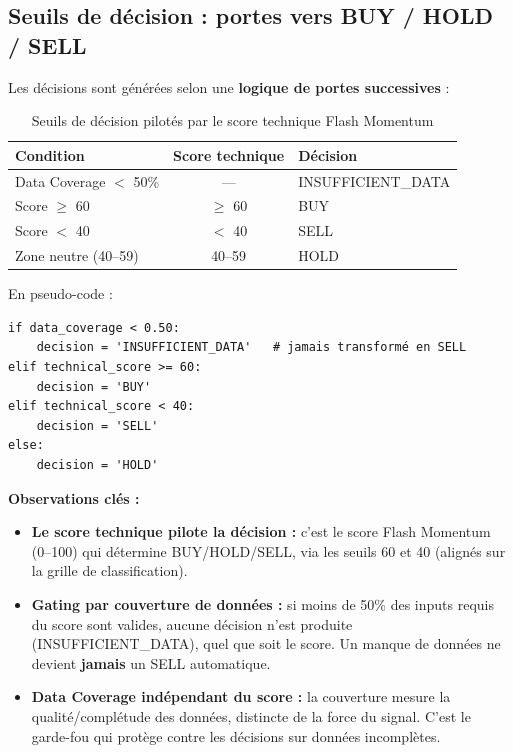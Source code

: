 \documentclass{rapportENSIAS} %
\begin{document}
\subsection{Seuils de décision : portes vers BUY / HOLD / SELL}

\noindent
Les décisions sont générées selon une \textbf{logique de portes successives} :

\begin{table}[H]
\centering
\small
\begin{tabular}{p{5cm}cl}
\toprule
\textbf{Condition} & \textbf{Score technique} & \textbf{Décision} \\
\midrule
Data Coverage $<$ 50\%   & --- & INSUFFICIENT\_DATA \\
Score $\ge$ 60           & $\ge$ 60 & BUY \\
Score $<$ 40             & $<$ 40 & SELL \\
Zone neutre (40--59)     & 40--59 & HOLD \\
\bottomrule
\end{tabular}
\caption{Seuils de décision pilotés par le score technique Flash Momentum}
\label{tab:decision-thresholds}
\end{table}

\noindent
En pseudo-code :

\begin{verbatim}
if data_coverage < 0.50:
    decision = 'INSUFFICIENT_DATA'   # jamais transformé en SELL
elif technical_score >= 60:
    decision = 'BUY'
elif technical_score < 40:
    decision = 'SELL'
else:
    decision = 'HOLD'
\end{verbatim}

\noindent
\textbf{Observations clés :}
\begin{itemize}
    \item \textbf{Le score technique pilote la décision :} c'est le score Flash Momentum (0--100) qui détermine BUY/HOLD/SELL, via les seuils 60 et 40 (alignés sur la grille de classification).
    \item \textbf{Gating par couverture de données :} si moins de 50\% des inputs requis du score sont valides, aucune décision n'est produite (INSUFFICIENT\_DATA), quel que soit le score. Un manque de données ne devient \textbf{jamais} un SELL automatique.
    \item \textbf{Data Coverage indépendant du score :} la couverture mesure la qualité/complétude des données, distincte de la force du signal. C'est le garde-fou qui protège contre les décisions sur données incomplètes.
\end{itemize}
\end{document}
